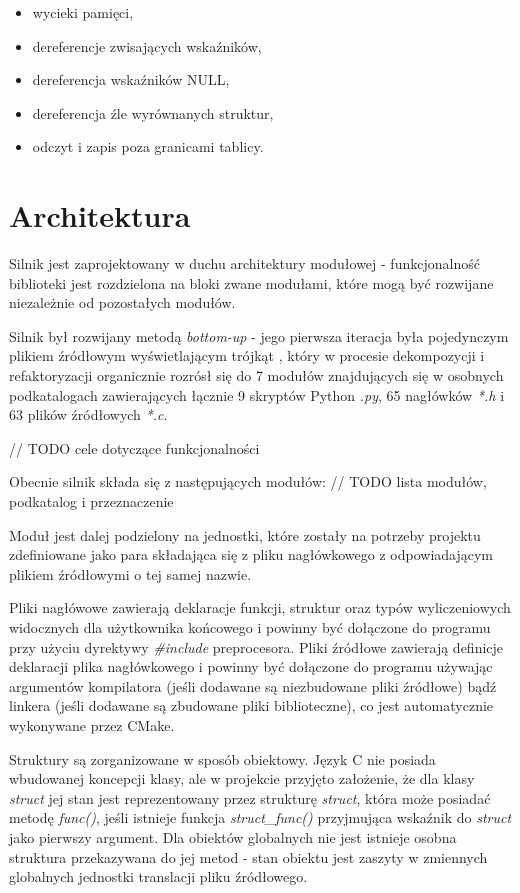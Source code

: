 \begin{itemize}
	\item wycieki pamięci,
	\item dereferencje zwisających wskaźników,
	\item dereferencja wskaźników NULL,
	\item dereferencja źle wyrównanych struktur,
	\item odczyt i zapis poza granicami tablicy.
\end{itemize}

\section{Architektura}

Silnik jest zaprojektowany w duchu architektury modułowej - funkcjonalność biblioteki jest rozdzielona na bloki zwane modułami, które mogą być rozwijane niezależnie od pozostałych modułów.

Silnik był rozwijany metodą \textit{bottom-up} - jego pierwsza iteracja była pojedynczym plikiem źródłowym wyświetlającym trójkąt \cite{VULKANTUTORIAL}, który w procesie dekompozycji i refaktoryzacji organicznie rozrósł się do 7 modułów znajdujących się w osobnych podkatalogach zawierających łącznie 9 skryptów Python \textit{.py}, 65 nagłówków \textit{*.h} i 63 plików źródłowych \textit{*.c}.

// TODO cele dotyczące funkcjonalności

Obecnie silnik składa się z następujących modułów:
// TODO lista modułów, podkatalog i przeznaczenie

Moduł jest dalej podzielony na jednostki, które zostały na potrzeby projektu zdefiniowane jako para składająca się z pliku nagłówkowego z odpowiadającym plikiem źródłowymi o tej samej nazwie.

Pliki nagłówowe zawierają deklaracje funkcji, struktur oraz typów wyliczeniowych widocznych dla użytkownika końcowego i powinny być dołączone do programu przy użyciu dyrektywy \textit{\#include} preprocesora.
Pliki źródłowe zawierają definicje deklaracji plika nagłówkowego i powinny być dołączone do programu używając argumentów kompilatora (jeśli dodawane są niezbudowane pliki źródłowe) bądź linkera (jeśli dodawane są zbudowane pliki biblioteczne), co jest automatycznie wykonywane przez CMake.

Struktury są zorganizowane w sposób obiektowy.
Język C nie posiada wbudowanej koncepcji klasy, ale w projekcie przyjęto założenie, że dla klasy \textit{struct} jej stan jest reprezentowany przez strukturę \textit{struct}, która może posiadać metodę \textit{func()}, jeśli istnieje funkcja \textit{struct\_func()} przyjmująca wskaźnik do \textit{struct} jako pierwszy argument.
Dla obiektów globalnych nie jest istnieje osobna struktura przekazywana do jej metod - stan obiektu jest zaszyty w zmiennych globalnych jednostki translacji pliku źródłowego.

